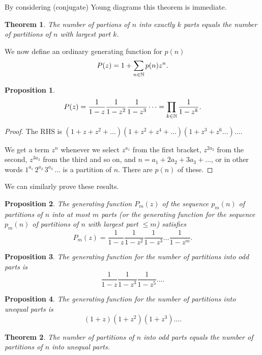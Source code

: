 \documentclass{notes}
\theoremstyle{plain}
\newtheorem{theorem}{Theorem}[chapter]
\newtheorem*{proposition}{Proposition}
\begin{document}
By considering (conjugate) Young diagrams this theorem is immediate.

\begin{theorem}
The number of partions of $n$ into exactly $k$ parts equals the number of
partitions of $n$ with largest part $k$.
\end{theorem}

We now define an ordinary generating function for $p(n)$
\[
P(z) = 1 + \sum_{n \in \mathbb{N}} p(n) z^n.
\]

\begin{proposition}
\[
P(z) = \frac{1}{1-z} \frac{1}{1-z^2} \frac{1}{1-z^3} \dots
= \prod_{k \in \mathbb{N}} \frac{1}{1-z^k}.
\]
\end{proposition}

\begin{proof}
The RHS is
$(1 + z + z^2 + \dots) (1+ z^2 + z^4 + \dots) (1+ z^3 + z^6 \dots ) \dots$.

We get a term $z^n$ whenever we select $z^{a_1}$ from the first bracket,
$z^{2 a_2}$ from the second, $z^{3 a_3}$ from the third and so on, and
$n = a_1 + 2a_2 + 3 a_3 + \dots$, or in other words
$1^{a_1}\, 2^{a_2}\, 3^{a_3}\, \dots$ is a partition of $n$.  There are
$p(n)$ of these.
\end{proof}

We can similarly prove these results.

\begin{proposition}
The generating function $P_m(z)$ of the sequence $p_m(n)$ of partitions of
$n$ into at most $m$ parts (or the generating function for the sequence
$p_m(n)$ of partitions of $n$ with largest part $\le m$) satisfies
\[
P_m(z) = \frac{1}{1-z} \frac{1}{1-z^2} \frac{1}{1-z^3} \dots \frac{1}{1-z^m}.
\]
\end{proposition}

\begin{proposition}
The generating function for the number of partitions into odd parts is
\[
\frac{1}{1-z} \frac{1}{1-z^3} \frac{1}{1-z^5} \dots.
\]
\end{proposition}

\begin{proposition}
The generating function for the number of partitions into unequal parts is
\[
(1+z) (1+z^2) (1+z^3) \dots.
\]
\end{proposition}

\begin{theorem}
The number of partitions of $n$ into odd parts equals the number of
partitions of $n$ into unequal parts.
\end{theorem}
\end{document}
